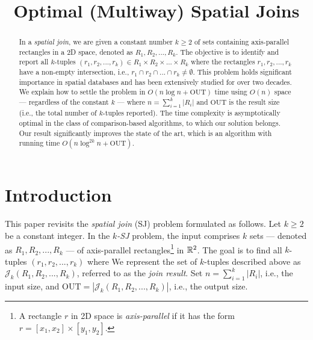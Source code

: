 \documentclass[sigconf]{acmart}
\def\J{\mathcal{J}}
\def\out{\mathrm{OUT}}
\begin{document}
    
\title{Optimal (Multiway) Spatial Joins}


\author{}


\begin{abstract}
    In a {\em spatial join}, we are given a constant number $k \geq 2$ of sets containing axis-parallel rectangles in a 2D space, denoted as $R_1, R_2, ..., R_k$. The objective is to identify and report all $k$-tuples $(r_1, r_2, ..., r_k) \in R_1 \times R_2 \times ... \times R_k$ where the rectangles $r_1, r_2, ..., r_k$ have a non-empty intersection, i.e., $r_1 \cap r_2 \cap ... \cap r_k \neq \emptyset$. This problem holds significant importance in spatial databases and has been extensively studied for over two decades. We explain how to settle the problem in $O(n \log n + \out)$ time using $O(n)$ space --- regardless of the constant $k$ --- where $n = \sum_{i=1}^k |R_i|$ and $\out$ is the result size (i.e., the total number of $k$-tuples reported). The time complexity is asymptotically optimal in the class of comparison-based algorithms, to which our solution belongs. Our result significantly improves the state of the art, which is an algorithm with running time $O(n \log^{2k} n + \out)$.
\end{abstract}

\maketitle 

\section{Introduction} \label{sec:intro}

This paper revisits the {\em spatial join} (SJ) problem formulated as follows. Let $k \ge 2$ be a constant integer. In the {\em $k$-SJ} problem, the input comprises $k$ sets --- denoted as $R_1, R_2, ..., R_k$ --- of axis-parallel rectangles\footnote{A rectangle $r$ in 2D space is {\em axis-parallel} if it has the form $r = [x_1, x_2] \times [y_1, y_2]$.} in $\mathbb{R}^2$. The goal is to find all $k$-tuples $(r_1, r_2, ..., r_k)$ where
We represent the set of $k$-tuples described above as $\J_k(R_1, R_2, ..., R_k)$, referred to as the {\em join result}. Set $n = \sum_{i=1}^k |R_i|$, i.e., the input size, and $\out = |\J_k(R_1, R_2, ..., R_k)|$, i.e., the output size.
\end{document}
